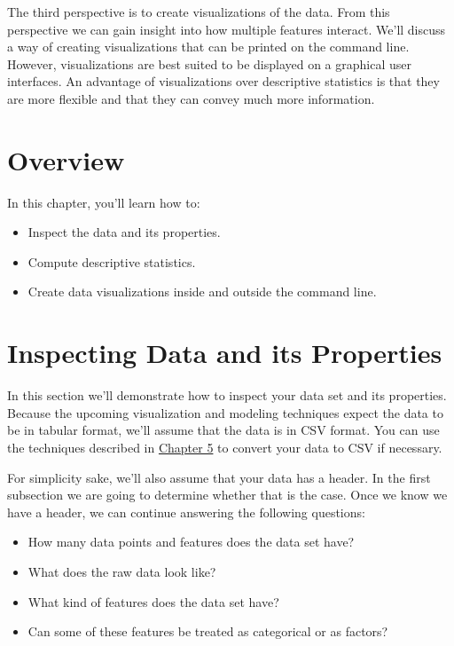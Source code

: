 \documentclass[
]{book}
\providecommand{\tightlist}{%
  \setlength{\itemsep}{0pt}\setlength{\parskip}{0pt}}
\theoremstyle{definition}
\theoremstyle{definition}
\theoremstyle{definition}
\theoremstyle{remark}
\begin{document}
The third perspective is to create visualizations of the data. From this perspective we can gain insight into how multiple features interact. We'll discuss a way of creating visualizations that can be printed on the command line. However, visualizations are best suited to be displayed on a graphical user interfaces. An advantage of visualizations over descriptive statistics is that they are more flexible and that they can convey much more information.

\hypertarget{overview}{%
\section{Overview}\label{overview}}

In this chapter, you'll learn how to:

\begin{itemize}
\tightlist
\item
  Inspect the data and its properties.
\item
  Compute descriptive statistics.
\item
  Create data visualizations inside and outside the command line.
\end{itemize}

\hypertarget{inspecting-data-and-its-properties}{%
\section{Inspecting Data and its Properties}\label{inspecting-data-and-its-properties}}

In this section we'll demonstrate how to inspect your data set and its properties. Because the upcoming visualization and modeling techniques expect the data to be in tabular format, we'll assume that the data is in CSV format. You can use the techniques described in \protect\hyperlink{chapter-5-scrubbing-data}{Chapter 5} to convert your data to CSV if necessary.

For simplicity sake, we'll also assume that your data has a header. In the first subsection we are going to determine whether that is the case. Once we know we have a header, we can continue answering the following questions:

\begin{itemize}
\tightlist
\item
  How many data points and features does the data set have?
\item
  What does the raw data look like?
\item
  What kind of features does the data set have?
\item
  Can some of these features be treated as categorical or as factors?
\end{itemize}
\end{document}
